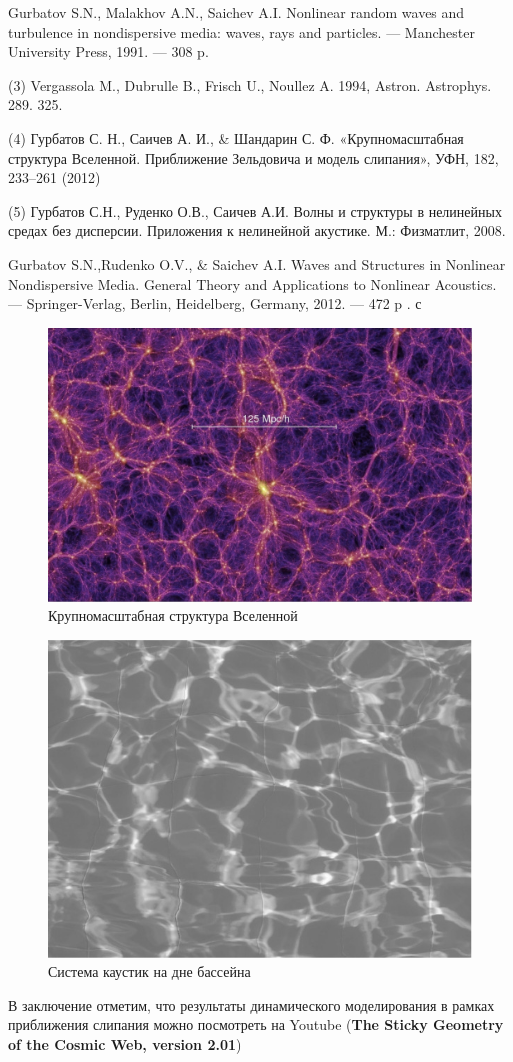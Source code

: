 Gurbatov S.N., Malakhov A.N., Saichev A.I. Nonlinear random waves and turbulence in nondispersive media: waves, rays and particles. — Manchester University Press, 1991. — 308 p.

(3) Vergassola M., Dubrulle B., Frisch U., Noullez A. 1994, Astron. Astrophys. 289. 325.

(4) Гурбатов С. Н., Саичев А. И., \& Шандарин С. Ф.   «Крупномасштабная структура Вселенной. Приближение Зельдовича и модель слипания»,  УФН, 182,  233–261 (2012)

(5) Гурбатов С.Н., Руденко О.В., Саичев А.И. Волны и структуры в нелинейных средах без дисперсии. Приложения к нелинейной акустике. М.: Физматлит, 2008.

Gurbatov S.N.,Rudenko O.V., \& Saichev A.I. Waves and Structures in Nonlinear Nondispersive Media. General Theory and Applications to Nonlinear Acoustics. — Springer-Verlag, Berlin, Heidelberg, Germany, 2012. — 472 p . с
\begin{figure}[tb]
	\centering
	\includegraphics[width=.6\linewidth]{photo/1.jpg}
	\caption{Крупномасштабная структура Вселенной}
	\label{fig:figure1}
\end{figure}
\begin{figure}[tb]
	\centering
	\includegraphics[width=.6\linewidth]{photo/2.png}
	\caption{Система каустик на дне бассейна}
	\label{fig:figure2}
\end{figure}
В заключение отметим, что результаты динамического моделирования в рамках приближения слипания можно посмотреть на Youtube (\textbf{The Sticky Geometry of the Cosmic Web, version 2.01})

